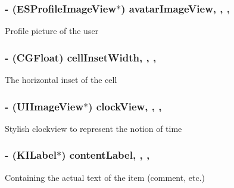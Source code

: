 \subsubsection[{avatar\+Image\+View}]{\setlength{\rightskip}{0pt plus 5cm}-\/ ({\bf E\+S\+Profile\+Image\+View}$\ast$) avatar\+Image\+View\hspace{0.3cm}{\ttfamily [read]}, {\ttfamily [write]}, {\ttfamily [nonatomic]}, {\ttfamily [strong]}}\label{interface_e_s_base_text_cell_a3afbb92a442232007932c5fb6403fc70}
Profile picture of the user \hypertarget{interface_e_s_base_text_cell_a33fe87f42012cfb4ca4e494e4b6644ac}{}
\subsubsection[{cell\+Inset\+Width}]{\setlength{\rightskip}{0pt plus 5cm}-\/ (C\+G\+Float) cell\+Inset\+Width\hspace{0.3cm}{\ttfamily [read]}, {\ttfamily [write]}, {\ttfamily [nonatomic]}, {\ttfamily [assign]}}\label{interface_e_s_base_text_cell_a33fe87f42012cfb4ca4e494e4b6644ac}
The horizontal inset of the cell \hypertarget{interface_e_s_base_text_cell_a40f80dae70a3041498e02108f0af9c67}{}
\subsubsection[{clock\+View}]{\setlength{\rightskip}{0pt plus 5cm}-\/ (U\+I\+Image\+View$\ast$) clock\+View\hspace{0.3cm}{\ttfamily [read]}, {\ttfamily [write]}, {\ttfamily [nonatomic]}, {\ttfamily [strong]}}\label{interface_e_s_base_text_cell_a40f80dae70a3041498e02108f0af9c67}
Stylish clockview to represent the notion of \textquotesingle{}time\textquotesingle{} \hypertarget{interface_e_s_base_text_cell_a6927a252eca5009fee050dac34234e38}{}
\subsubsection[{content\+Label}]{\setlength{\rightskip}{0pt plus 5cm}-\/ ({\bf K\+I\+Label}$\ast$) content\+Label\hspace{0.3cm}{\ttfamily [read]}, {\ttfamily [write]}, {\ttfamily [nonatomic]}, {\ttfamily [strong]}}\label{interface_e_s_base_text_cell_a6927a252eca5009fee050dac34234e38}
Containing the actual text of the item (comment, etc.) \hypertarget{interface_e_s_base_text_cell_a199ecd22aed8dbb7c3e1425e3ebf0df8}{}

